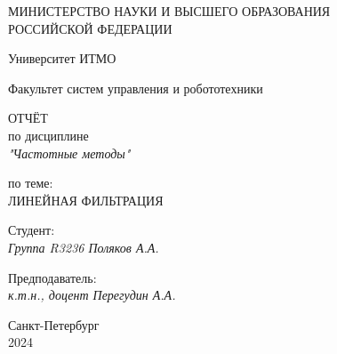 \thispagestyle{empty}

\begin{center}
    МИНИСТЕРСТВО НАУКИ И ВЫСШЕГО ОБРАЗОВАНИЯ \\ РОССИЙСКОЙ ФЕДЕРАЦИИ

    \vspace{20pt}

    Университет ИТМО

    \vspace{20pt}

    Факультет систем управления и робототехники
\end{center}

\vfill

\begin{center}
    ОТЧЁТ \\  
    по дисциплине \\
    \textit{"Частотные методы"}

    \vspace{20pt}

    по теме: \\
    \uppercase{Линейная фильтрация}
\end{center}

\vfill

    \noindent Студент: \\
    \textit{Группа R3236 \hfill Поляков А.А.}

    \vspace{20pt}

    \noindent Предподаватель: \\
    \textit{к.т.н., доцент \hfill Перегудин А.А.}

\vfill

\begin{center}
    Санкт-Петербург \\ 2024
\end{center}